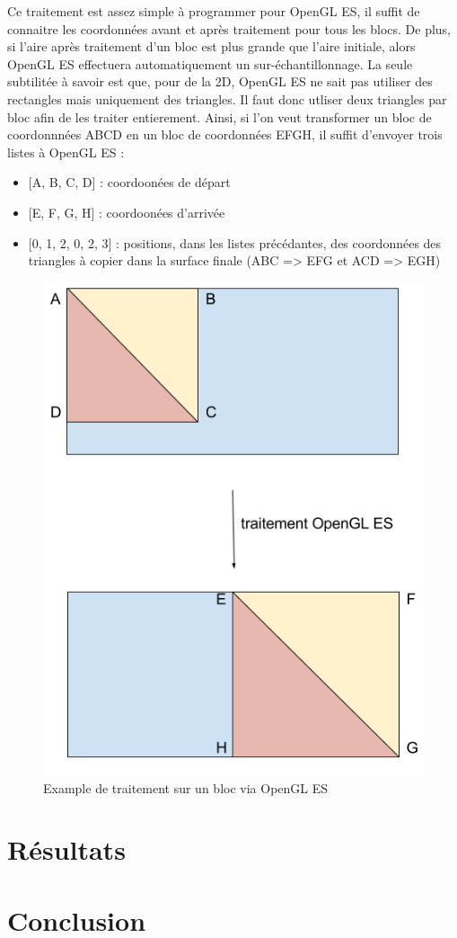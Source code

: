 \documentclass[11pt,a4paper]{article}
\begin{document}
\bigbreak
Ce traitement est assez simple à programmer pour OpenGL ES, il suffit de connaitre les coordonnées avant et après traitement pour tous les blocs.
De plus, si l'aire après traitement d'un bloc est plus grande que l'aire initiale, alors OpenGL ES effectuera automatiquement un sur-échantillonnage.
La seule subtilitée à savoir est que, pour de la 2D, OpenGL ES ne sait pas utiliser des rectangles mais uniquement des triangles.
Il faut donc utliser deux triangles par bloc afin de les traiter entierement.
Ainsi, si l'on veut transformer un bloc de coordonnnées ABCD en un bloc de coordonnées EFGH, il suffit d'envoyer trois listes à OpenGL ES :

\bigbreak
\begin{itemize}
\item{[A, B, C, D] : coordoonées de départ}
\item{[E, F, G, H] : coordoonées d'arrivée}
\item{[0, 1, 2, 0, 2, 3] : positions, dans les listes précédantes, des coordonnées des triangles à copier dans la surface finale (ABC => EFG et ACD => EGH)}
\end{itemize}

\begin{figure}[H]
\begin{center}
\includegraphics[scale=0.35]{images/OpenGL_ES.png}
\end{center}
\caption{Example de traitement sur un bloc via OpenGL ES}
\label{}
\end{figure}

\section{Résultats}

\section{Conclusion}
\end{document}

